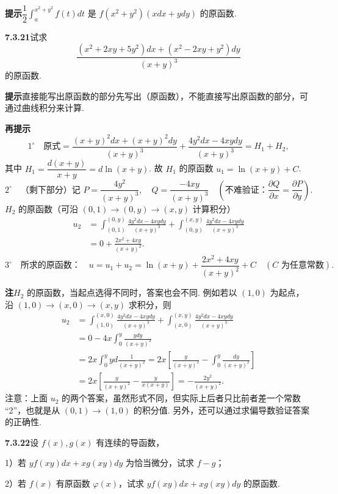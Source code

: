 \documentclass[UTF8, 12pt, fontset=fandol, oneside]{ctexart}
\begin{document}
\noindent\textbf{提示}\quad $\dfrac12\displaystyle\int_a^{x^2+y^2}f(t)dt$ 是 $f(x^2+y^2)(xdx+ydy)$ 的原函数.

\noindent\textbf{7.3.21}\quad 试求
\[
\frac{(x^2+2xy+5y^2)dx+(x^2-2xy+y^2)dy}{(x+y)^3}
\]
的原函数.

\noindent\textbf{提示}\quad 直接能写出原函数的部分先写出（原函数），不能直接写出原函数的部分，可通过曲线积分来计算.

\noindent\textbf{再提示}\quad
\[
1^\circ\quad
\text{原式}=
\frac{(x+y)^2dx+(x+y)^2dy}{(x+y)^3}
+\frac{4y^2dx-4xydy}{(x+y)^3}=H_1+H_2,
\]
其中 $H_1=\dfrac{d(x+y)}{x+y}=d\ln(x+y)$. 故 $H_1$ 的原函数 $u_1=\ln(x+y)+C$.
\[
2^\circ\quad
\text{（剩下部分）记 }P=\frac{4y^2}{(x+y)^3},\quad
Q=\frac{-4xy}{(x+y)^3}\quad
\left(\text{不难验证：}\frac{\partial Q}{\partial x}=\frac{\partial P}{\partial y}\right).
\]
$H_2$ 的原函数（可沿 $(0,1)\to(0,y)\to(x,y)$ 计算积分）
\[
\begin{aligned}
u_2&=\int_{(0,1)}^{(0,y)}\frac{4y^2dx-4xydy}{(x+y)^3}
+\int_{(0,y)}^{(x,y)}\frac{4y^2dx-4xydy}{(x+y)^3}\\
&=0+\frac{2x^2+4xy}{(x+y)^2}.
\end{aligned}
\]
\[
3^\circ\quad
\text{所求的原函数：}\quad
u=u_1+u_2=\ln(x+y)+\frac{2x^2+4xy}{(x+y)^2}+C
\quad(C\text{ 为任意常数}).
\]

\noindent\textbf{注}\quad $H_2$ 的原函数，当起点选得不同时，答案也会不同. 例如若以 $(1,0)$ 为起点，沿 $(1,0)\to(x,0)\to(x,y)$ 求积分，则
\[
\begin{aligned}
u_2&=\int_{(1,0)}^{(x,0)}\frac{4y^2dx-4xydy}{(x+y)^3}
+\int_{(x,0)}^{(x,y)}\frac{4y^2dx-4xydy}{(x+y)^3}\\
&=0-4x\int_0^y\frac{ydy}{(x+y)^3}\\
&=2x\int_0^yyd\frac1{(x+y)^2}
=2x\left[\frac y{(x+y)^2}-\int_0^y\frac{dy}{(x+y)^2}\right]\\
&=2x\left[\frac y{(x+y)^2}-\frac y{x(x+y)}\right]
=-\frac{2y^2}{(x+y)^2}.
\end{aligned}
\]
注意：上面 $u_2$ 的两个答案，虽然形式不同，但实际上后者只比前者差一个常数 “2”，也就是从 $(0,1)\to(1,0)$ 的积分值. 另外，还可以通过求偏导数验证答案的正确性.

\noindent\textbf{7.3.22}\quad 设 $f(x),g(x)$ 有连续的导函数，

1）若 $yf(xy)dx+xg(xy)dy$ 为恰当微分，试求 $f-g$；

2）若 $f(x)$ 有原函数 $\varphi(x)$，试求 $yf(xy)dx+xg(xy)dy$ 的原函数.
\end{document}
